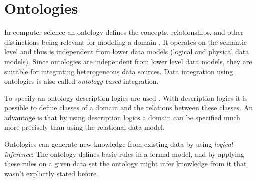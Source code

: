 \section{Ontologies}

In computer science an ontology defines the concepts, relationships, and other distinctions being relevant for modeling a domain \cite{9780387355443}. It operates on the semantic level and thus is independent from lower data models (logical and physical data models). Since ontologies are independent from lower level data models, they are suitable for integrating heterogeneous data sources. Data integration using ontologies is also called \emph{ontology-based} integration.

To specify an ontology description logics are used \cite[p. 267]{DBLP:books/dp/LeserN2006}. With description logics it is possible to define classes of a domain and the relations between these classes. An advantage is that by using description logics a domain can be specified much more precisely than using the relational data model. 

Ontologies can generate new knowledge from existing data by using \emph{logical inference}: The ontology defines basic rules in a formal model, and by applying these rules on a given data set the ontology might infer knowledge from it that wasn't explicitly stated before.